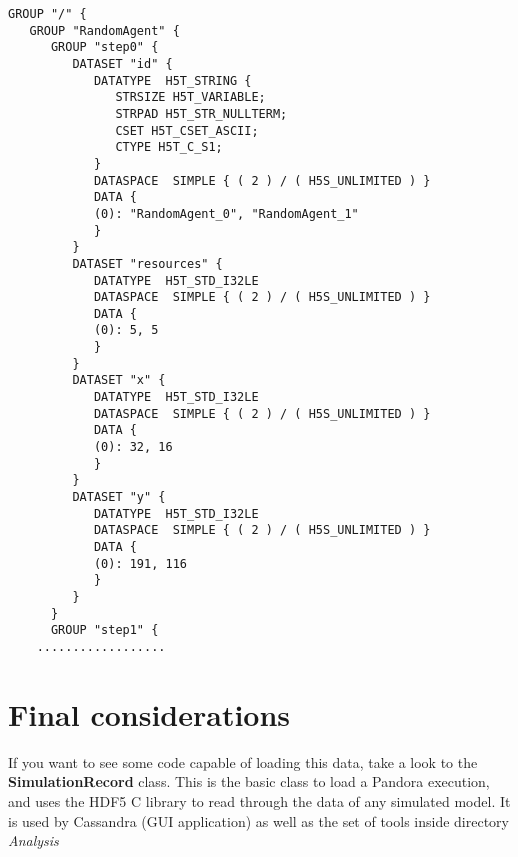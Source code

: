 \documentclass[a4paper,10pt]{article}
\begin{document}
\begin{verbatim}
GROUP "/" {
   GROUP "RandomAgent" {
      GROUP "step0" {
         DATASET "id" {
            DATATYPE  H5T_STRING {
               STRSIZE H5T_VARIABLE;
               STRPAD H5T_STR_NULLTERM;
               CSET H5T_CSET_ASCII;
               CTYPE H5T_C_S1;
            }
            DATASPACE  SIMPLE { ( 2 ) / ( H5S_UNLIMITED ) }
            DATA {
            (0): "RandomAgent_0", "RandomAgent_1"
            }
         }
         DATASET "resources" {
            DATATYPE  H5T_STD_I32LE
            DATASPACE  SIMPLE { ( 2 ) / ( H5S_UNLIMITED ) }
            DATA {
            (0): 5, 5
            }
         }
         DATASET "x" {
            DATATYPE  H5T_STD_I32LE
            DATASPACE  SIMPLE { ( 2 ) / ( H5S_UNLIMITED ) }
            DATA {
            (0): 32, 16
            }
         }
         DATASET "y" {
            DATATYPE  H5T_STD_I32LE
            DATASPACE  SIMPLE { ( 2 ) / ( H5S_UNLIMITED ) }
            DATA {
            (0): 191, 116
            }
         }
      } 
      GROUP "step1" {
	..................
\end{verbatim}

\section{Final considerations}

If you want to see some code capable of loading this data, take a look to the \textbf{SimulationRecord} class. This is the basic class to load a Pandora execution, and uses the HDF5 C library to read through the data of any simulated model. It is used by Cassandra (GUI application) as well as the set of tools inside directory \textit{Analysis}
\end{document}

